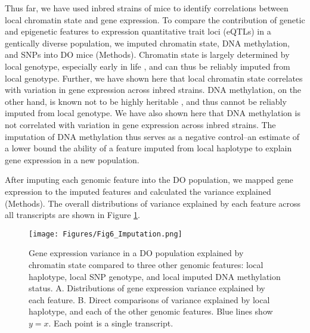 \documentclass[
  11pt,
]{article}
\begin{document}
Thus far, we have used inbred strains of mice to identify correlations
between local chromatin state and gene expression. To compare the
contribution of genetic and epigenetic features to expression
quantitative trait loci (eQTLs) in a gentically diverse population, we
imputed chromatin state, DNA methylation, and SNPs into DO mice
(Methods). Chromatin state is largely determined by local genotype,
especially early in life \citep{pmid16009939}, and can thus be reliably
imputed from local genotype. Further, we have shown here that local
chromatin state correlates with variation in gene expression across
inbred strains. DNA methylation, on the other hand, is known not to be
highly heritable \citep{pmid33931130}, and thus cannot be reliably
imputed from local genotype. We have also shown here that DNA
methylation is not correlated with variation in gene expression across
inbred strains. The imputation of DNA methylation thus serves as a
negative control--an estimate of a lower bound the ability of a feature
imputed from local haplotype to explain gene expression in a new
population.

After imputing each genomic feature into the DO population, we mapped
gene expression to the imputed features and calculated the variance
explained (Methods). The overall distributions of variance explained by
each feature across all transcripts are shown in Figure
\ref{fig:effect_distrubutions}.

\begin{figure}[ht!]
\texttt{[image: Figures/Fig6\_Imputation.png]} 
\caption{Gene expression variance in a DO population explained 
by chromatin state compared to three other genomic features: 
local haplotype, local SNP genotype, and local imputed DNA 
methylation status. A. Distributions of gene expression variance 
explained by each feature. B. Direct comparisons of 
variance explained by local haplotype, and each of the other 
genomic features. Blue lines show $y = x$. Each point is a 
single transcript.}
\label{fig:effect_distrubutions}
\end{figure}
\end{document}
